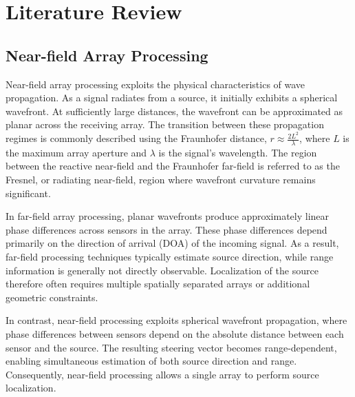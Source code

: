 %
%
%
%

\chapter{Literature Review}

\section{Near-field Array Processing}

Near-field array processing exploits the physical characteristics of wave propagation. As a signal radiates from a source, it initially exhibits a spherical wavefront. At sufficiently large distances, the wavefront can be approximated as planar across the receiving array. The transition between these propagation regimes is commonly described using the Fraunhofer distance, $r\approx\frac{2L^2}{\lambda}$, where $L$ is the maximum array aperture and $\lambda$ is the signal's wavelength. The region between the reactive near-field and the Fraunhofer far-field is referred to as the Fresnel, or radiating near-field, region where wavefront curvature remains significant\cite{array_freq_invariance}.

In far-field array processing, planar wavefronts produce approximately linear phase differences across sensors in the array. These phase differences depend primarily on the direction of arrival (DOA) of the incoming signal. As a result, far-field processing techniques typically estimate source direction, while range information is generally not directly observable. Localization of the source therefore often requires multiple spatially separated arrays or additional geometric constraints.

In contrast, near-field processing exploits spherical wavefront propagation, where phase differences between sensors depend on the absolute distance between each sensor and the source. The resulting steering vector becomes range-dependent, enabling simultaneous estimation of both source direction and range. Consequently, near-field processing allows a single array to perform source localization\cite{Adaptive_Beamforming}\cite{Sensor_Position}.

